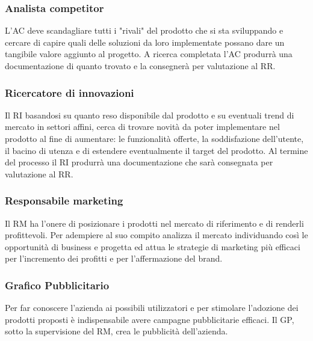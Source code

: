 \subsubsection{Analista competitor}
L\textquoteright{}AC deve scandagliare tutti i "rivali" del prodotto che si sta sviluppando e cercare
di capire quali delle soluzioni da loro implementate possano dare un tangibile valore
aggiunto al progetto. A ricerca completata l\textquoteright{}AC produrr\`{a} una documentazione di quanto
trovato e la consegner\`{a} per valutazione al RR.

\subsubsection{Ricercatore di innovazioni}
Il RI basandosi su quanto reso disponibile dal prodotto e su eventuali trend di mercato
in settori affini, cerca di trovare novit\`{a} da poter implementare nel prodotto al fine di
aumentare: le funzionalit\`{a} offerte, la soddisfazione dell\textquoteright{}utente, il bacino di utenza e di
estendere eventualmente il target del prodotto. Al termine del processo il RI produrr\`{a}
una documentazione che sar\`{a} consegnata per valutazione al RR.

\subsubsection{Responsabile marketing}
Il RM ha l\textquoteright{}onere di posizionare i prodotti nel mercato di riferimento e di renderli profittevoli.
Per adempiere al suo compito analizza il mercato individuando cos\`{i} le opportunit\`{a}
di business e progetta ed attua le strategie di marketing pi\`{u} efficaci per l\textquoteright{}incremento
dei profitti e per l\textquoteright{}affermazione del brand.

\subsubsection{Grafico Pubblicitario}
Per far conoscere l\textquoteright{}azienda ai possibili utilizzatori e per stimolare l\textquoteright{}adozione dei prodotti
proposti \`{e} indispensabile avere campagne pubblicitarie efficaci. Il GP, sotto la
supervisione del RM, crea le pubblicit\`{a} dell\textquoteright{}azienda.

